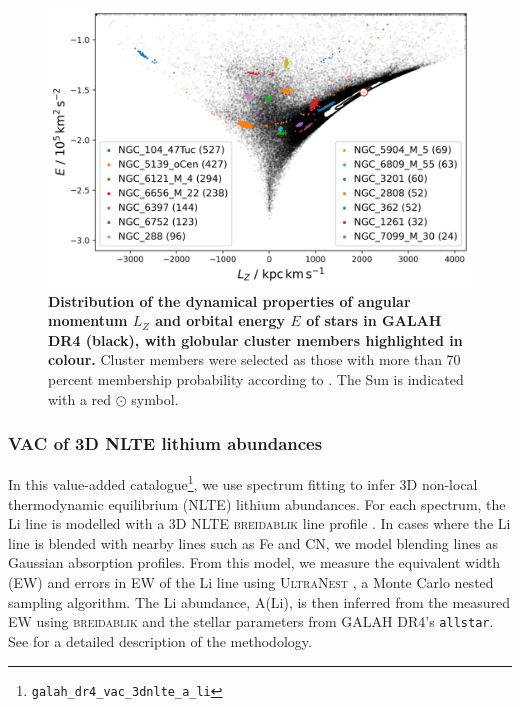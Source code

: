 \documentclass[
  journal=pasa,
  manuscript=research-paper, %
  year=2024,
  volume=37
]{cup-journal}
\newcommand{\breidablik}{\textsc{breidablik}\xspace}
\begin{document}
\begin{figure}[ht]
\includegraphics[width=\columnwidth]{figures/galah_dr4_lz_e_with_gcs.png}
\caption{
\textbf{Distribution of the dynamical properties of angular momentum $L_Z$ and orbital energy $E$ of stars in GALAH DR4 (black), with globular cluster members highlighted in colour.} Cluster members were selected as those with more than 70 percent membership probability according to \citet{Vasiliev2021}. The Sun is indicated with a red $\odot$ symbol.
}
\label{fig:galah_dr4_lz_e_with_gcs}
\end{figure}

\subsubsection{VAC of 3D NLTE lithium abundances}
\label{sec:VAC_li}

In this value-added catalogue\footnote{\texttt{galah\_dr4\_vac\_3dnlte\_a\_li}}, we use spectrum fitting to infer 3D non-local thermodynamic equilibrium (NLTE) lithium abundances. For each spectrum, the Li line is modelled with a 3D NLTE \breidablik line profile \citep{Wang2021}. In cases where the Li line is blended with nearby lines such as Fe and CN, we model blending lines as Gaussian absorption profiles. From this model, we measure the equivalent width (EW) and errors in EW of the Li line using \textsc{UltraNest} \citep{Buchner2021}, a Monte Carlo nested sampling algorithm. The Li abundance, A(Li), is then inferred from the measured EW using \breidablik and the stellar parameters from GALAH DR4's \texttt{allstar}. See \citet{Wang2024} for a detailed description of the methodology. 
\end{document}
